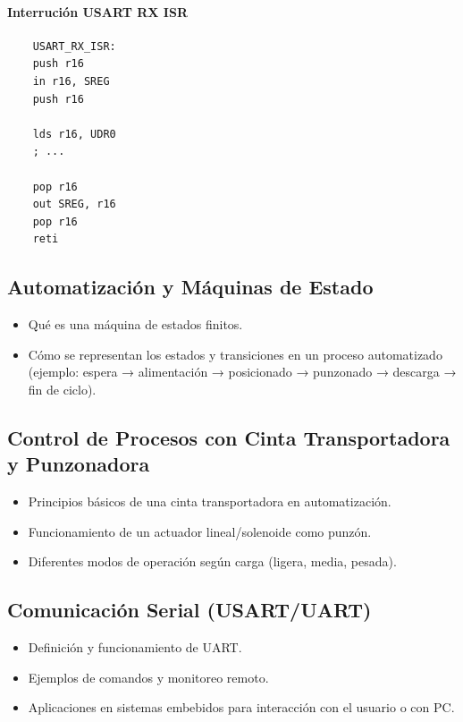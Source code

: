     
    \paragraph*{Interrución USART RX ISR}
    \begin{verbatim}
    USART_RX_ISR:
    push r16 
    in r16, SREG
    push r16

    lds r16, UDR0 
    ; ...

    pop r16
    out SREG, r16
    pop r16
    reti
    \end{verbatim}
    



\subsection{Automatización y Máquinas de Estado}
\begin{itemize}
    \item Qué es una máquina de estados finitos.
    \item Cómo se representan los estados y transiciones en un proceso automatizado (ejemplo: espera → alimentación → posicionado → punzonado → descarga → fin de ciclo).
\end{itemize}


\subsection{Control de Procesos con Cinta Transportadora y Punzonadora}
\begin{itemize}
    \item Principios básicos de una cinta transportadora en automatización.
    \item Funcionamiento de un actuador lineal/solenoide como punzón.
    \item Diferentes modos de operación según carga (ligera, media, pesada).
\end{itemize}


\subsection{Comunicación Serial (USART/UART)}
\begin{itemize}
    \item Definición y funcionamiento de UART.
    \item Ejemplos de comandos y monitoreo remoto.
    \item Aplicaciones en sistemas embebidos para interacción con el usuario o con PC.
\end{itemize}


